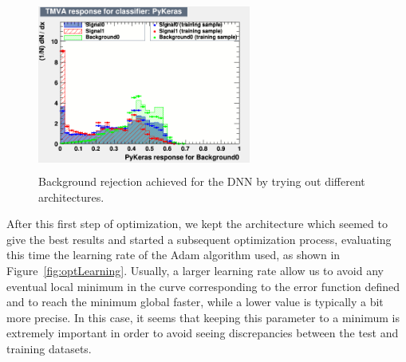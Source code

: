 \documentclass[a4paper, 10pt, openright]{report}
\begin{document}
\begin{appendices}
\begin{figure}[htbp]
{\begin{minipage}[b]{.48\textwidth}
\includegraphics[width=7cm, height=5.7cm]{figs/DNN_arch20_15_10_5.png}
\end{minipage} \hfill
}
\caption{Background rejection achieved for the \ac{DNN} by trying out different architectures.}
\label{fig:optLayers}
\end{figure}

After this first step of optimization, we kept the architecture which seemed to give the best results and started a subsequent optimization process, evaluating this time the learning rate of the Adam algorithm used, as shown in Figure~\ref{fig:optLearning}. Usually, a larger learning rate allow us to avoid any eventual local minimum in the curve corresponding to the error function defined and to reach the minimum global faster, while a lower value is typically a bit more precise. In this case, it seems that keeping this parameter to a minimum is extremely important in order to avoid seeing discrepancies between the test and training datasets.


\end{appendices}
\end{document}
